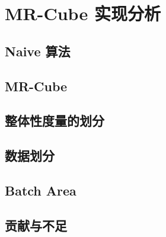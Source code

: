\chapter{MR-Cube 实现分析}


\section{Naive 算法}



\section{MR-Cube}


\section{整体性度量的划分}

\section{数据划分}

\section{Batch Area}

\section{贡献与不足}

